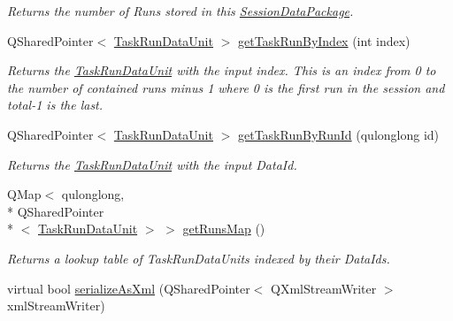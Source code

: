 \begin{DoxyCompactItemize}
\begin{DoxyCompactList}\small\item\em Returns the number of Runs stored in this \hyperlink{class_picto_1_1_session_data_package}{Session\-Data\-Package}. \end{DoxyCompactList}\item 
Q\-Shared\-Pointer$<$ \hyperlink{class_picto_1_1_task_run_data_unit}{Task\-Run\-Data\-Unit} $>$ \hyperlink{class_picto_1_1_session_data_package_a120681aa179ae23e5eb8a352ac3e7c1c}{get\-Task\-Run\-By\-Index} (int index)
\begin{DoxyCompactList}\small\item\em Returns the \hyperlink{class_picto_1_1_task_run_data_unit}{Task\-Run\-Data\-Unit} with the input index. This is an index from 0 to the number of contained runs minus 1 where 0 is the first run in the session and total-\/1 is the last. \end{DoxyCompactList}\item 
Q\-Shared\-Pointer$<$ \hyperlink{class_picto_1_1_task_run_data_unit}{Task\-Run\-Data\-Unit} $>$ \hyperlink{class_picto_1_1_session_data_package_a972dbe6aa4287a0a845f33bb7748fb61}{get\-Task\-Run\-By\-Run\-Id} (qulonglong id)
\begin{DoxyCompactList}\small\item\em Returns the \hyperlink{class_picto_1_1_task_run_data_unit}{Task\-Run\-Data\-Unit} with the input Data\-Id. \end{DoxyCompactList}\item 
\hypertarget{class_picto_1_1_session_data_package_a01100428ec491fbbe06fd92839162e14}{Q\-Map$<$ qulonglong, \\*
Q\-Shared\-Pointer\\*
$<$ \hyperlink{class_picto_1_1_task_run_data_unit}{Task\-Run\-Data\-Unit} $>$ $>$ \hyperlink{class_picto_1_1_session_data_package_a01100428ec491fbbe06fd92839162e14}{get\-Runs\-Map} ()}\label{class_picto_1_1_session_data_package_a01100428ec491fbbe06fd92839162e14}

\begin{DoxyCompactList}\small\item\em Returns a lookup table of Task\-Run\-Data\-Units indexed by their Data\-Ids. \end{DoxyCompactList}\item 
\hypertarget{class_picto_1_1_session_data_package_a3ec471b0a7ac49d68740809027ea0d08}{virtual bool \hyperlink{class_picto_1_1_session_data_package_a3ec471b0a7ac49d68740809027ea0d08}{serialize\-As\-Xml} (Q\-Shared\-Pointer$<$ Q\-Xml\-Stream\-Writer $>$ xml\-Stream\-Writer)}\label{class_picto_1_1_session_data_package_a3ec471b0a7ac49d68740809027ea0d08}


\end{DoxyCompactItemize}
